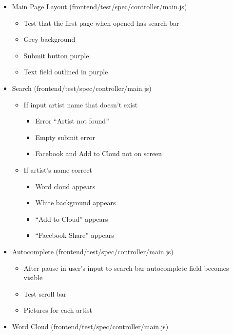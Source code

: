 \documentclass[]{article}
\begin{document}
\begin{itemize}
\itemsep1pt\parskip0pt
\item
  Main Page Layout (frontend/test/spec/controller/main.js)

  \begin{itemize}
  \itemsep1pt\parskip0pt
  \item
    Test that the first page when opened has search bar
  \item
    Grey background
  \item
    Submit button purple
  \item
    Text field outlined in purple
  \end{itemize}
\item
  Search (frontend/test/spec/controller/main.js)

  \begin{itemize}
  \itemsep1pt\parskip0pt
  \item
    If input artist name that doesn't exist

    \begin{itemize}
    \itemsep1pt\parskip0pt
    \item
      Error ``Artist not found''
    \item
      Empty submit error
    \item
      Facebook and Add to Cloud not on screen
    \end{itemize}
  \item
    If artist's name correct

    \begin{itemize}
    \itemsep1pt\parskip0pt
    \item
      Word cloud appears
    \item
      White background appears
    \item
      ``Add to Cloud'' appears
    \item
      ``Facebook Share'' appears
    \end{itemize}
  \end{itemize}
\item
  Autocomplete (frontend/test/spec/controller/main.js)

  \begin{itemize}
  \itemsep1pt\parskip0pt
  \item
    After pause in user's input to search bar autocomplete field becomes
    visible
  \item
    Test scroll bar
  \item
    Pictures for each artist
  \end{itemize}
\item
  Word Cloud (frontend/test/spec/controller/main.js)


\end{itemize}
\end{document}
